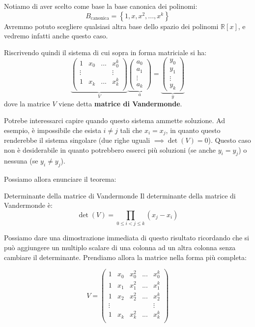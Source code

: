 \documentclass[a4paper,11pt]{article}
\begin{document}
Notiamo di aver scelto come base la base canonica dei polinomi:
$$
B_\text{canonica} = \left\{ 1, x, x^2, ..., x^k \right\}
$$
Avremmo potuto scegliere qualsiasi altra base dello spazio dei polinomi $\mathbb{R}[x]$, e vedremo infatti anche questo caso.

Riscrivendo quindi il sistema di cui sopra in forma matriciale si ha:
$$
\underbrace{
\begin{pmatrix}
	1 & x_0 & ... & x_0^k \\
	\vdots  & & & \vdots \\
	1 & x_k & ... & x_k^k \\
\end{pmatrix}
}_V
\underbrace{
\begin{pmatrix}
	a_0 \\ a_1 \\ \vdots \\ a_k
\end{pmatrix}
}_a
=
\underbrace{
\begin{pmatrix}
	y_0 \\ y_1 \\ \vdots \\ y_k 
\end{pmatrix}
}_y
$$
dove la matrice $V$ viene detta \textbf{matrice di Vandermonde}.

Potrebe interessarci capire quando questo sistema ammette soluzione.
Ad esempio, è impossibile che esista $i \neq j$ tali che $x_i = x_j$, in quanto questo renderebbe il sistema singolare (due righe uguali $\implies \det(V) = 0$).
Questo caso non è desiderabile in quanto potrebbero esserci più soluzioni (se anche $y_i = y_j$) o nessuna (se $y_i \neq y_j$).

Possiamo allora enunciare il teorema:
\begin{theorem}{Determinante della matrice di Vandermonde}
	Il determinante della matrice di Vandermonde è:
	$$
	\det(V) = \prod_{0 \leq i < j \leq k} (x_j - x_i)
	$$
\end{theorem}
Possiamo dare una dimostrazione immediata di questo risultato ricordando che si può aggiungere un multiplo scalare di una colonna ad un altra colonna senza cambiare il determinante.
Prendiamo allora la matrice nella forma più completa:

$$
V = 
\begin{pmatrix}
	1 & x_0 & x_0^2 & ... & x_0^k \\
	1 & x_1 & x_1^2 & ... & x_1^k \\
	1 & x_2 & x_2^2 & ... & x_2^k \\
	\vdots & & & & \vdots \\
	1 & x_k & x_k^2 & ... & x_k^k \\
\end{pmatrix}
$$
\end{document}
